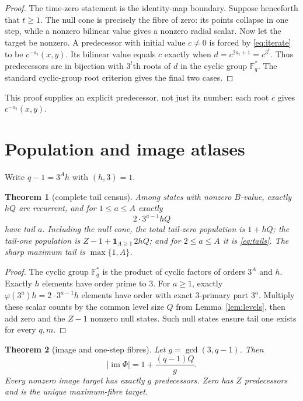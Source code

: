 \documentclass[a4paper,10pt]{amsart}
\newtheorem{theorem}{Theorem}[section]
\theoremstyle{remark}
\newcommand{\Fq}{\mathbb F_q}
\newcommand{\1}{\mathbf 1}
\begin{document}
\begin{proof}
The time-zero statement is the identity-map boundary.  Suppose henceforth
that $t\ge1$.
The null cone is precisely the fibre of zero: its points collapse in one
step, while a nonzero bilinear value gives a nonzero radial scalar.  Now let
the target be nonzero.  A predecessor with initial value $c\ne0$ is forced by
\eqref{eq:iterate} to be
$c^{-a_t}(x,y)$.  Its bilinear value equals $c$ exactly when
$d=c^{2a_t+1}=c^{3^t}$.  Thus predecessors are in bijection with
$3^t$th roots of $d$ in the cyclic group $\Fq^*$.  The standard cyclic-group
root criterion gives the final two cases.
\end{proof}

This proof supplies an explicit predecessor, not just its number: each root
$c$ gives $c^{-a_t}(x,y)$.

\section{Population and image atlases}

Write $q-1=3^A h$ with $(h,3)=1$.

\begin{theorem}[complete tail census]\label{thm:census}
Among states with nonzero $B$-value, exactly $hQ$ are recurrent, and for
$1\le a\le A$ exactly
\begin{equation}\label{eq:tails}
 2\cdot3^{a-1}hQ
\end{equation}
have tail $a$.  Including the null cone, the total tail-zero population is
$1+hQ$; the tail-one population is
$Z-1+\1_{A\ge1}\,2hQ$; and for $2\le a\le A$ it is
\eqref{eq:tails}.  The sharp maximum tail is $\max\{1,A\}$.
\end{theorem}

\begin{proof}
The cyclic group $\Fq^*$ is the product of cyclic factors of orders $3^A$
and $h$.  Exactly $h$ elements have order prime to $3$.  For $a\ge1$,
exactly $\varphi(3^a)h=2\cdot3^{a-1}h$ elements have order with exact
$3$-primary part $3^a$.  Multiply these scalar counts by the common level
size $Q$ from Lemma~\ref{lem:levels}, then add zero and the $Z-1$ nonzero
null states.  Such null states ensure tail one exists for every $q,m$.
\end{proof}

\begin{theorem}[image and one-step fibres]\label{thm:image}
Let $g=\gcd(3,q-1)$.  Then
\begin{equation}\label{eq:image}
 |\operatorname{im}\Phi|=1+\frac{(q-1)Q}{g}.
\end{equation}
Every nonzero image target has exactly $g$ predecessors.  Zero has $Z$
predecessors and is the unique maximum-fibre target.
\end{theorem}
\end{document}
